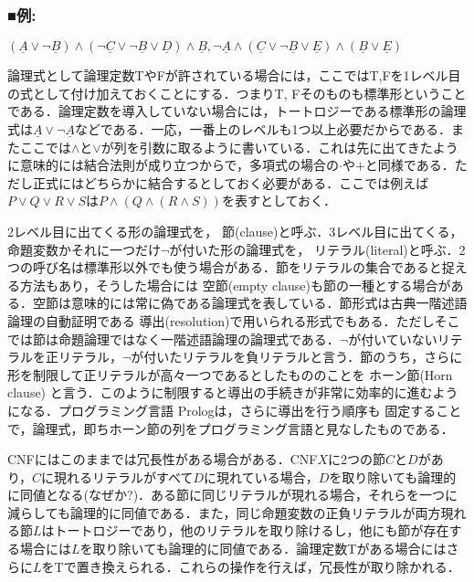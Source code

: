\documentclass{ltjsarticle}
\theoremstyle{mystyle1}
\theoremstyle{mystyle3}
\theoremstyle{mystyle2}
\newcommand{\uA}{\underline{A}}
\newcommand{\uB}{\underline{B}}
\newcommand{\uC}{\underline{C}}
\newcommand{\uD}{\underline{D}}
\newcommand{\uE}{\underline{E}}
\newcommand{\red}[1]{{\color{red} #1}}
\begin{document}
\subsubsection*{■例:}
$(\uA\vee\neg\uB)\wedge(\neg\uC\vee\neg\uB\vee\uD)\wedge\uB,\neg\uA\wedge(\uC\vee\neg\uB\vee\uE)\wedge(\uB\vee\uE)$

論理式として論理定数TやFが許されている場合には，ここではT,Fを1レベル目の式として付け加えておくことにする．つまりT, Fそのものも標準形ということである．論理定数を導入していない場合には，トートロジーである標準形の論理式は$\uA\vee\neg\uA$などである．一応，一番上のレベルも1つ以上必要だからである．またここでは$\wedge$と$\vee$が列を引数に取るように書いている．これは先に出てきたように意味的には結合法則が成り立つからで，多項式の場合の$\cdot$や$+$と同様である．ただし正式にはどちらかに結合するとしておく必要がある．ここでは例えば$P\vee Q\vee R\vee S$は$P\wedge(Q\wedge(R\wedge S))$を表すとしておく．

2レベル目に出てくる形の論理式を，\red{節}(clause)と呼ぶ．3レベル目に出てくる，命題変数かそれに一つだけ$\neg$が付いた形の論理式を，\red{リテラル}(literal)と呼ぶ．2つの呼び名は標準形以外でも使う場合がある．節をリテラルの集合であると捉える方法もあり，そうした場合には\red{空節}(empty clause)も節の一種とする場合がある．空節は意味的には常に偽である論理式を表している．節形式は古典一階述語論理の自動証明である\red{導出}(resolution)で用いられる形式でもある．ただしそこでは節は命題論理ではなく一階述語論理の論理式である．$\neg$が付いていないリテラルを正リテラル，$\neg$が付いたリテラルを負リテラルと言う．節のうち，さらに形を制限して正リテラルが高々一つであるとしたもののことを\red{ホーン節}(Horn clause) と言う．このように制限すると導出の手続きが非常に効率的に進むようになる．プログラミング言語\red{Prolog}は，さらに導出を行う順序も 固定することで，論理式，即ちホーン節の列をプログラミング言語と見なしたものである．

CNFにはこのままでは冗長性がある場合がある．CNF$X$に2つの節$C$と$D$があり，$C$に現れるリテラルがすべて$D$に現れている場合，$D$を取り除いても論理的に同値となる(なぜか?)．ある節に同じリテラルが現れる場合，それらを一つに減らしても論理的に同値である．また，同じ命題変数の正負リテラルが両方現れる節$L$はトートロジーであり，他のリテラルを取り除けるし，他にも節が存在する場合には$L$を取り除いても論理的に同値である．論理定数Tがある場合にはさらに$L$をTで置き換えられる．これらの操作を行えば，冗長性が取り除かれる．
\end{document}

